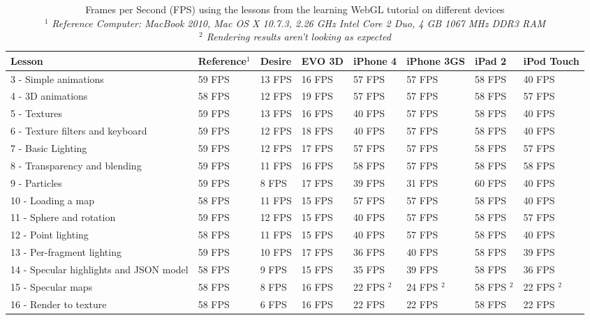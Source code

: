 \documentclass[12pt,journal,compsoc]{IEEEtran}
\begin{document}
\begin{table*}[tb]
	\begin{centering}
	\begin{tabular}{l|l|l|l|l|l|l|l}
		\textbf{Lesson}								& \textbf{Reference$^{1}$}& \textbf{Desire}		& \textbf{EVO 3D}		& \textbf{iPhone 4}		& \textbf{iPhone 3GS}	& \textbf{iPad 2}	& \textbf{iPod Touch}\\
		\hline
		3 - Simple animations						& 59 FPS		& 13 FPS		& 16 FPS		& 57 FPS		& 57 FPS		& 58 FPS	& 40 FPS				\\
		4 - 3D animations							& 58 FPS		& 12 FPS		& 19 FPS		& 57 FPS		& 57 FPS		& 58 FPS	& 57 FPS				\\
		5 - Textures								& 59 FPS		& 13 FPS		& 16 FPS		& 40 FPS		& 57 FPS		& 58 FPS	& 40 FPS				\\
		6 - Texture filters and keyboard			& 59 FPS		& 12 FPS		& 18 FPS		& 40 FPS		& 57 FPS		& 58 FPS	& 40 FPS				\\
		7 - Basic Lighting							& 59 FPS		& 12 FPS		& 17 FPS		& 57 FPS		& 57 FPS		& 58 FPS	& 57 FPS				\\
		8 - Transparency and blending				& 59 FPS		& 11 FPS		& 16 FPS		& 58 FPS		& 57 FPS		& 58 FPS	& 58 FPS				\\
		9 - Particles								& 59 FPS		&  8 FPS		& 17 FPS		& 39 FPS		& 31 FPS		& 60 FPS	& 40 FPS				\\
		10 - Loading a map							& 58 FPS		& 11 FPS		& 15 FPS		& 57 FPS		& 57 FPS		& 58 FPS	& 40 FPS				\\
		11 - Sphere and rotation					& 59 FPS		& 12 FPS		& 15 FPS		& 40 FPS		& 57 FPS		& 58 FPS	& 57 FPS				\\
		12 - Point lighting							& 58 FPS		& 11 FPS		& 15 FPS		& 40 FPS		& 57 FPS		& 58 FPS	& 40 FPS				\\
		13 - Per-fragment lighting					& 59 FPS		& 10 FPS		& 17 FPS		& 36 FPS		& 40 FPS		& 58 FPS	& 39 FPS				\\
		14 - Specular highlights and JSON model		& 58 FPS		&  9 FPS		& 15 FPS		& 35 FPS		& 39 FPS		& 58 FPS	& 36 FPS				\\
		15 - Specular maps							& 58 FPS		&  8 FPS		& 16 FPS		& 22 FPS $^{2}$	& 24 FPS $^{2}$	& 58 FPS $^{2}$	& 22 FPS $^{2}$ 		\\
		16 - Render to texture						& 58 FPS		&  6 FPS		& 16 FPS		& 22 FPS		& 22 FPS		& 58 FPS	& 22 FPS				\\
	\end{tabular}
	\caption{Frames per Second (FPS) using the lessons from the learning WebGL tutorial on different devices\label{lessonsTable}
	\\\textit{$^{1}$ Reference Computer: MacBook 2010, Mac OS X 10.7.3, 2.26 GHz Intel Core 2 Duo, 4 GB 1067 MHz DDR3 RAM}
	\\\textit{$^{2}$ Rendering results aren't looking as expected}
	}
	\end{centering}
\end{table*}
\end{document}

